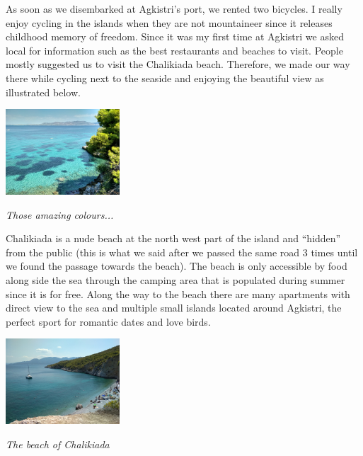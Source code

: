 \documentclass[10pt,a4paper]{article} %
\begin{document}
\begin{multicols}{3}
As soon as we disembarked at Agkistri's port, we rented two bicycles. 
I really enjoy cycling in the islands when they are not mountaineer since it 
releases childhood memory of freedom.  
Since it was my first time at Agkistri we asked local for information such as 
the best restaurants and beaches to visit. 
People mostly suggested us to visit the Chalikiada beach. 
Therefore, we made our way there while cycling next to the seaside and enjoying 
the beautiful view as illustrated below.
 

\begin{center}
	\includegraphics[width=0.32\textwidth]{media/agkistri_beach}
	\par\textit{Those amazing colours...}
\end{center}


Chalikiada is a nude beach at the north west part of the island and ``hidden'' from 
the public (this is what we said after we passed the same road 3 times until we found 
the passage towards the beach).  
The beach is only accessible by food along side the sea through the camping area 
that is populated during summer since it is for free. 
Along the way to the beach there are many apartments with direct view to the sea 
and multiple small islands located around Agkistri, the perfect sport for 
romantic dates and love birds.


\begin{center}
	\includegraphics[width=0.32\textwidth]{media/chalikiada_beach}
	\par\textit{The beach of Chalikiada}
\end{center}



\end{multicols}
\end{document}
